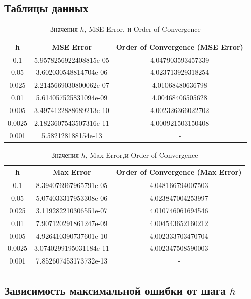 \documentclass{article}
\begin{document}
\subsection{Таблицы данных}
\begin{table}[H]
\centering
\begin{tabular}{|c|c|c|}
\hline
\textbf{h} & \textbf{MSE Error} & \textbf{Order of Convergence (MSE Error)} \\ \hline
0.1 & 5.9578256922408815e-05 & 4.047903593457339 \\ \hline
0.05 & 3.602030548814704e-06 & 4.023713929318254 \\ \hline
0.025 & 2.2145669030800062e-07 & 4.01068480636798 \\ \hline
0.01 & 5.614057525831094e-09 & 4.00468406505628 \\ \hline
0.005 & 3.4974122888689213e-10 & 4.002326366022702 \\ \hline
0.0025 & 2.1823607543507316e-11 & 4.000921503150408 \\ \hline
0.001 & 5.582128188154e-13 & - \\ \hline
\end{tabular}
\caption{Значения \( h \), MSE Error, и Order of Convergence}
\end{table}

\begin{table}[H]
\centering
\begin{tabular}{|c|c|c|}
\hline
\textbf{h} & \textbf{Max Error} & \textbf{Order of Convergence (Max Error)} \\ \hline
0.1 & 8.394076967965791e-05 & 4.048166794007503 \\ \hline
0.05 & 5.074033317953308e-06 & 4.023847004253997 \\ \hline
0.025 & 3.119282210306551e-07 & 4.010746061694546 \\ \hline
0.01 & 7.907120291861247e-09 & 4.004543652160212 \\ \hline
0.005 & 4.926410390737601e-10 & 4.002333703470704 \\ \hline
0.0025 & 3.0740299195031184e-11 & 4.002347508590003 \\ \hline
0.001 & 7.852607453173732e-13 & - \\ \hline
\end{tabular}
\caption{Значения \( h \), Max Error,и Order of Convergence}
\end{table}





\subsection{Зависимость максимальной ошибки от шага \( h \)}
\end{document}
